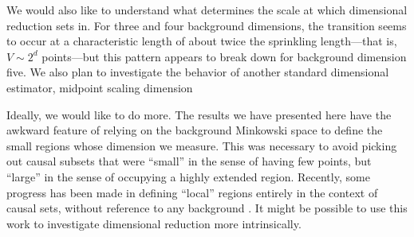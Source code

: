 \documentclass[12pt]{article}
\begin{document}
We would also like to understand what determines the scale at which dimensional
reduction sets in.  For three and four background dimensions, the transition seems to
occur at a characteristic length of about twice the sprinkling length---that is,
$V\sim 2^d$ points---but this pattern appears to break down for background
 dimension five.  We also plan to investigate the behavior of another standard
dimensional estimator, midpoint scaling dimension 

Ideally, we would like to do more.  The results we have presented here have the
awkward feature of relying on the background Minkowski space to define the
small regions whose dimension we measure.  This was necessary to avoid picking
out causal subsets that were ``small'' in the sense of having few points, but
``large'' in the sense of occupying a highly extended region.  Recently, some
progress has been made in defining ``local'' regions entirely in the context of
causal sets, without reference to any background .  It might be
possible to use this work to investigate dimensional reduction more intrinsically.
\end{document}
